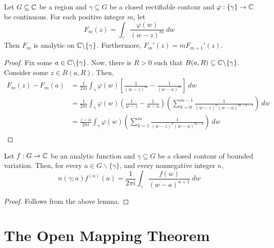 \begin{lemma}
    Let $G\subseteq\mathbb{C}$ be a region and $\gamma\subseteq G$ be a closed rectifiable contour and $\varphi: \{\gamma\}\to\mathbb{C}$ be continuous. For each positive integer $m$, let 
    \begin{equation*}
        F_m(z) = \int_{\gamma}\frac{\varphi(w)}{(w - z)^m}~dw
    \end{equation*}
    Then $F_m$ is analytic on $\mathbb{C}\backslash\{\gamma\}$. Furthermore, $F_m'(z) = mF_{m + 1}'(z)$.
\end{lemma}
\begin{proof}
    Fix some $a\in\mathbb{C}\backslash\{\gamma\}$. Now, there is $R > 0$ such that $B(a,R)\subseteq\mathbb{C}\backslash\{\gamma\}$. Consider some $z\in B(a,R)$. Then, 
    \begin{align*}
        F_m(z) - F_m(a) &= \frac{1}{2\pi i}\int_{\gamma}\varphi(w)\left[\frac{1}{(w - z)^{m}} - \frac{1}{(w - a)^m}\right]~dw\\
        &= \frac{1}{2\pi i}\int_\gamma\varphi(w)\left(\frac{1}{w - z} - \frac{1}{w - a}\right)\left(\sum_{k = 0}^{m - 1}\frac{1}{(w - z)^k(w - a)^{m - k - 1}}\right)~dw\\
        &= \frac{z - a}{2\pi i}\int_\gamma\varphi(w)\left(\sum_{k = 1}^{m}\frac{1}{(w - z)^k(w - a)^{m - k}}\right)~dw\\
    \end{align*}
\end{proof}

\begin{theorem}
    Let $f: G\to\mathbb{C}$ be an analytic function and $\gamma\subseteq G$ be a closed contour of bounded variation. Then, for every $a\in G\backslash\{\gamma\}$, and every nonnegative integer $n$, 
    \begin{equation*}
        n(\gamma; a)f^{(n)}(a) = \frac{1}{2\pi i}\int_\gamma\frac{f(w)}{(w - a)^{n + 1}}~dw
    \end{equation*}
\end{theorem}
\begin{proof}
    Follows from the above lemma.
\end{proof}

\section{The Open Mapping Theorem}

